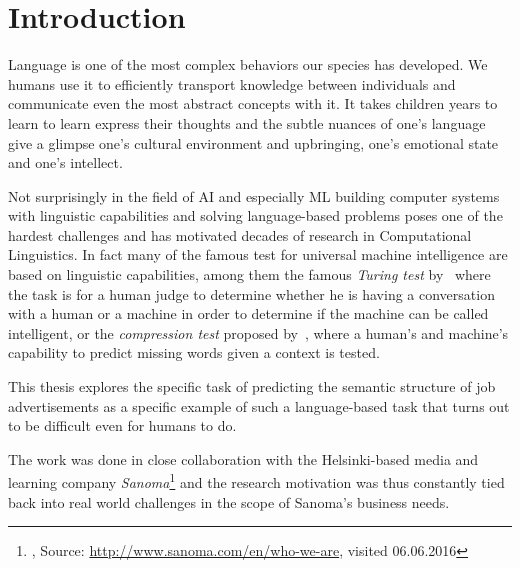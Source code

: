 
\thispagestyle{empty}

\section{Introduction}

Language is one of the most complex behaviors our species has developed. We humans use it to efficiently transport knowledge between individuals and communicate even the most abstract concepts with it. It takes children years to learn to learn express their thoughts and the subtle nuances of one's language give a glimpse one's cultural environment and upbringing, one's emotional state and one's intellect.

Not surprisingly in the field of \gls{AI} and especially \gls{ML} building computer systems with linguistic capabilities and solving language-based problems poses one of the hardest challenges and has motivated decades of research in Computational Linguistics. In fact many of the famous test for universal machine intelligence are based on linguistic capabilities, among them the famous \emph{Turing test} by~\cite{Turing:1950aa} where the task is for a human judge to determine whether he is having a conversation with a human or a machine in order to determine if the machine can be called intelligent, or the \emph{compression test} proposed by~\cite{Mahoney:1999aa}, where a human's and machine's capability to predict missing words given a context is tested.

This thesis explores the specific task of predicting the semantic structure of job advertisements as a specific example of such a language-based task that turns out to be difficult even for humans to do.

The work was done in close collaboration with the Helsinki-based media and learning company \emph{Sanoma}\footnote{, Source: \url{http://www.sanoma.com/en/who-we-are}, visited 06.06.2016} and the research motivation was thus constantly tied back into real world challenges in the scope of Sanoma's business needs.

